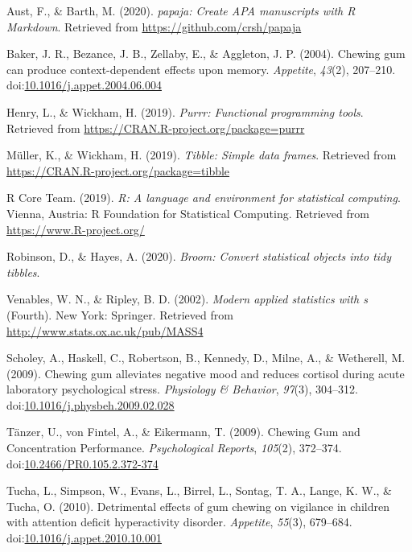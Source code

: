 \documentclass[
  english,
  man]{apa6}
\begin{document}
\leavevmode\hypertarget{ref-R-papaja}{}%
Aust, F., \& Barth, M. (2020). \emph{papaja: Create APA manuscripts with R Markdown}. Retrieved from \url{https://github.com/crsh/papaja}

\leavevmode\hypertarget{ref-bakerChewingGumCan2004}{}%
Baker, J. R., Bezance, J. B., Zellaby, E., \& Aggleton, J. P. (2004). Chewing gum can produce context-dependent effects upon memory. \emph{Appetite}, \emph{43}(2), 207--210. doi:\href{https://doi.org/10.1016/j.appet.2004.06.004}{10.1016/j.appet.2004.06.004}

\leavevmode\hypertarget{ref-R-purrr}{}%
Henry, L., \& Wickham, H. (2019). \emph{Purrr: Functional programming tools}. Retrieved from \url{https://CRAN.R-project.org/package=purrr}

\leavevmode\hypertarget{ref-R-tibble}{}%
Müller, K., \& Wickham, H. (2019). \emph{Tibble: Simple data frames}. Retrieved from \url{https://CRAN.R-project.org/package=tibble}

\leavevmode\hypertarget{ref-R-base}{}%
R Core Team. (2019). \emph{R: A language and environment for statistical computing}. Vienna, Austria: R Foundation for Statistical Computing. Retrieved from \url{https://www.R-project.org/}


\leavevmode\hypertarget{ref-R-broom}{}%
Robinson, D., \& Hayes, A. (2020). \emph{Broom: Convert statistical objects into tidy tibbles}.

\leavevmode\hypertarget{ref-R-MASS}{}%
Venables, W. N., \& Ripley, B. D. (2002). \emph{Modern applied statistics with s} (Fourth). New York: Springer. Retrieved from \url{http://www.stats.ox.ac.uk/pub/MASS4}

\leavevmode\hypertarget{ref-scholeyChewingGumAlleviates2009}{}%
Scholey, A., Haskell, C., Robertson, B., Kennedy, D., Milne, A., \& Wetherell, M. (2009). Chewing gum alleviates negative mood and reduces cortisol during acute laboratory psychological stress. \emph{Physiology \& Behavior}, \emph{97}(3), 304--312. doi:\href{https://doi.org/10.1016/j.physbeh.2009.02.028}{10.1016/j.physbeh.2009.02.028}

\leavevmode\hypertarget{ref-tanzerChewingGumConcentration2009}{}%
Tänzer, U., von Fintel, A., \& Eikermann, T. (2009). Chewing Gum and Concentration Performance. \emph{Psychological Reports}, \emph{105}(2), 372--374. doi:\href{https://doi.org/10.2466/PR0.105.2.372-374}{10.2466/PR0.105.2.372-374}

\leavevmode\hypertarget{ref-tuchaDetrimentalEffectsGum2010}{}%
Tucha, L., Simpson, W., Evans, L., Birrel, L., Sontag, T. A., Lange, K. W., \& Tucha, O. (2010). Detrimental effects of gum chewing on vigilance in children with attention deficit hyperactivity disorder. \emph{Appetite}, \emph{55}(3), 679--684. doi:\href{https://doi.org/10.1016/j.appet.2010.10.001}{10.1016/j.appet.2010.10.001}
\end{document}
